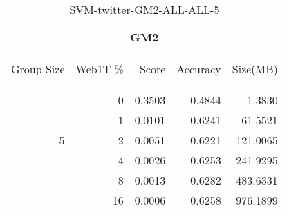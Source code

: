 \begin{center}
\begin{table}[htbp] 
 \begin{center}
\begin{tabular}{ | r | r | r | r | r |}
\hline
\multicolumn{5}{|c|}{GM2}\\
\hline
\begin{sideways}Group Size\end{sideways} & \begin{sideways}Web1T \%\end{sideways} & \begin{sideways}Score\end{sideways} & \begin{sideways}Accuracy\end{sideways} & \begin{sideways}Size(MB)\end{sideways}\\
\hline
\multirow{5}{*}{5}
 & 0 & 0.3503 & 0.4844 & 1.3830\\ \cline{2-5}
 & 1 & 0.0101 & 0.6241 & 61.5521\\ \cline{2-5}
 & 2 & 0.0051 & 0.6221 & 121.0065\\ \cline{2-5}
 & 4 & 0.0026 & 0.6253 & 241.9295\\ \cline{2-5}
 & 8 & 0.0013 & 0.6282 & 483.6331\\ \cline{2-5}
 & 16 & 0.0006 & 0.6258 & 976.1899\\ \cline{2-5}
\hline
\end{tabular}
\caption{SVM-twitter-GM2-ALL-ALL-5}
\label{table:SVM-twitter-GM2-ALL-ALL-5}
\end{center}
 \end{table}
\end{center}

